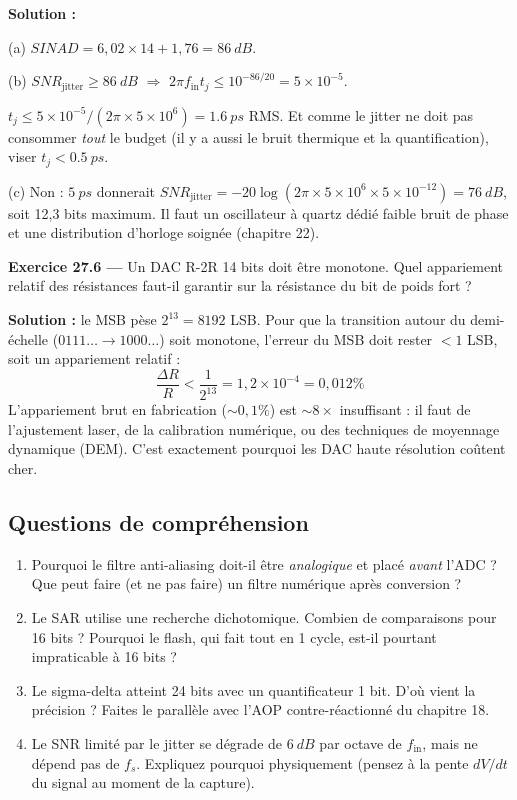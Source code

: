 \documentclass[12pt,a4paper,twoside]{book}
\begin{document}
\begin{pratique}
\textbf{Solution :}

(a) $SINAD = 6{,}02\times14 + 1{,}76 = \SI{86}{dB}$.

(b) $SNR_{\text{jitter}} \geq \SI{86}{dB}$ $\Rightarrow$ $2\pi f_{\text{in}} t_j \leq 10^{-86/20} = 5\times10^{-5}$.

$t_j \leq 5\times10^{-5}/(2\pi\times5\times10^6) = \SI{1.6}{ps}$ RMS. Et comme le jitter ne doit pas consommer \textit{tout} le budget (il y a aussi le bruit thermique et la quantification), viser $t_j < \SI{0.5}{ps}$.

(c) Non : $\SI{5}{ps}$ donnerait $SNR_{\text{jitter}} = -20\log(2\pi\times5\times10^6\times5\times10^{-12}) = \SI{76}{dB}$, soit 12,3 bits maximum. Il faut un oscillateur à quartz dédié faible bruit de phase et une distribution d'horloge soignée (chapitre 22).
\end{pratique}

\textbf{Exercice 27.6 ---} Un DAC R-2R 14 bits doit être monotone. Quel appariement relatif des résistances faut-il garantir sur la résistance du bit de poids fort ?

\begin{pratique}
\textbf{Solution :} le MSB pèse $2^{13} = 8192$ LSB. Pour que la transition autour du demi-échelle ($0111\ldots \to 1000\ldots$) soit monotone, l'erreur du MSB doit rester $< 1$ LSB, soit un appariement relatif :
\[
\frac{\Delta R}{R} < \frac{1}{2^{13}} = 1{,}2\times10^{-4} = 0{,}012\%
\]
L'appariement brut en fabrication ($\sim 0{,}1\%$) est $\sim 8\times$ insuffisant : il faut de l'ajustement laser, de la calibration numérique, ou des techniques de moyennage dynamique (DEM). C'est exactement pourquoi les DAC haute résolution coûtent cher.
\end{pratique}

\subsection*{Questions de compréhension}

\begin{enumerate}[nosep]
\item Pourquoi le filtre anti-aliasing doit-il être \textit{analogique} et placé \textit{avant} l'ADC ? Que peut faire (et ne pas faire) un filtre numérique après conversion ?
\item Le SAR utilise une recherche dichotomique. Combien de comparaisons pour 16 bits ? Pourquoi le flash, qui fait tout en 1 cycle, est-il pourtant impraticable à 16 bits ?
\item Le sigma-delta atteint 24 bits avec un quantificateur 1 bit. D'où vient la précision ? Faites le parallèle avec l'AOP contre-réactionné du chapitre 18.
\item Le SNR limité par le jitter se dégrade de $\SI{6}{dB}$ par octave de $f_{\text{in}}$, mais ne dépend pas de $f_s$. Expliquez pourquoi physiquement (pensez à la pente $dV/dt$ du signal au moment de la capture).
\end{enumerate}
\end{document}
